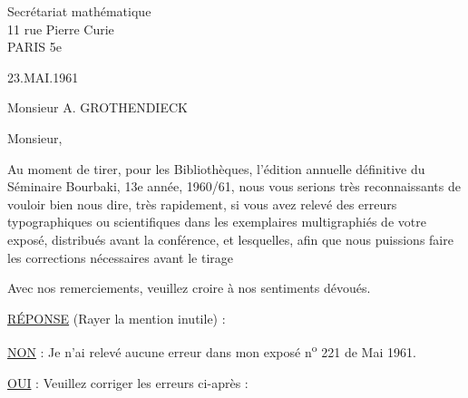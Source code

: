 
Secrétariat mathématique\\
11 rue Pierre Curie\\
PARIS 5e

\hfill 23.MAI.1961

\hfill Monsieur A. GROTHENDIECK

Monsieur,

Au moment de tirer, pour les Bibliothèques, l'édition annuelle définitive
du Séminaire Bourbaki, 13e année, 1960/61, nous vous serions très reconnaissants
de vouloir bien nous dire, très rapidement, si vous avez relevé des erreurs
typographiques ou scientifiques dans les exemplaires multigraphiés de votre
exposé, distribués avant la conférence, et lesquelles, afin que nous puissions
faire les corrections nécessaires avant le tirage

Avec nos remerciements, veuillez croire à nos sentiments dévoués.

\hfill\uline{}

\uline{RÉPONSE} (Rayer la mention inutile) :

\uline{NON} : Je n'ai relevé aucune erreur dans mon exposé n\textsuperscript{o} 221 de Mai 1961.

\uline{OUI} : Veuillez corriger les erreurs ci-après :
